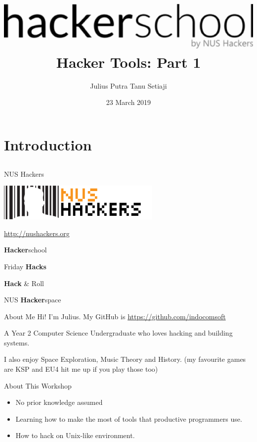 \documentclass[12pt]{beamer}
\title{\includegraphics[width=0.5\linewidth]{hackerschool} \\ Hacker Tools: Part 1}
\author{Julius Putra Tanu Setiaji}
\date{23 March 2019}
\begin{document}
\frame[plain]{\titlepage}

\section{Introduction}
\subsection{}

\begin{frame}{NUS Hackers}

  \begin{center}
    \includegraphics[width=0.5\linewidth]{NUSHackers}

    \url{http://nushackers.org}
  \end{center}

  \begin{center}
    \textbf{Hacker}school

    Friday \textbf{Hacks}

    \textbf{Hack} \& Roll

    NUS \textbf{Hacker}space
  \end{center}

\end{frame}

\begin{frame}{About Me}
  Hi! I'm Julius. My GitHub is \url{https://github.com/indocomsoft}

  A Year 2 Computer Science Undergraduate who loves hacking and building systems.

  I also enjoy Space Exploration, Music Theory and History. {\tiny (my favourite games are KSP and EU4 hit me up if you play those too)}
\end{frame}

\begin{frame}{About This Workshop}
  \begin{itemize}
    \item No prior knowledge assumed
    \item Learning how to make the most of tools that productive programmers use.
    \item How to hack on Unix-like environment.
  \end{itemize}
\end{frame}
\end{document}
